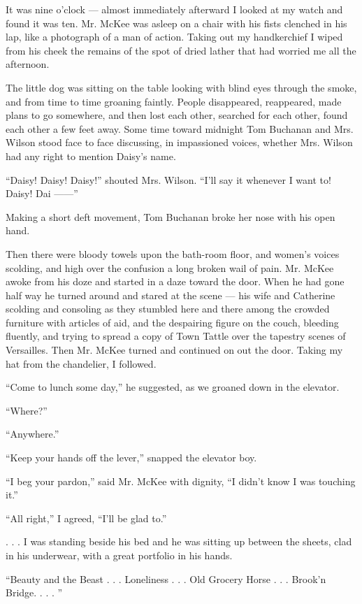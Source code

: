 \documentclass{znotebook}
\begin{document}
It was nine o'clock — almost immediately afterward I looked at my watch and found it was ten. Mr. McKee was asleep on a chair with his fists clenched in his lap, like a photograph of a man of action. Taking out my handkerchief I wiped from his cheek the remains of the spot of dried lather that had worried me all the afternoon.

The little dog was sitting on the table looking with blind eyes through the smoke, and from time to time groaning faintly. People disappeared, reappeared, made plans to go somewhere, and then lost each other, searched for each other, found each other a few feet away. Some time toward midnight Tom Buchanan and Mrs. Wilson stood face to face discussing, in impassioned voices, whether Mrs. Wilson had any right to mention Daisy's name.

``Daisy! Daisy! Daisy!'' shouted Mrs. Wilson. ``I'll say it whenever I want to! Daisy! Dai ——''

Making a short deft movement, Tom Buchanan broke her nose with his open hand.

Then there were bloody towels upon the bath-room floor, and women's voices scolding, and high over the confusion a long broken wail of pain. Mr. McKee awoke from his doze and started in a daze toward the door. When he had gone half way he turned around and stared at the scene — his wife and Catherine scolding and consoling as they stumbled here and there among the crowded furniture with articles of aid, and the despairing figure on the couch, bleeding fluently, and trying to spread a copy of Town Tattle over the tapestry scenes of Versailles. Then Mr. McKee turned and continued on out the door. Taking my hat from the chandelier, I followed.

``Come to lunch some day,'' he suggested, as we groaned down in the elevator.

``Where?''

``Anywhere.''

``Keep your hands off the lever,'' snapped the elevator boy.

``I beg your pardon,'' said Mr. McKee with dignity, ``I didn't know I was touching it.''

``All right,'' I agreed, ``I'll be glad to.''

. . . I was standing beside his bed and he was sitting up between the sheets, clad in his underwear, with a great portfolio in his hands.

``Beauty and the Beast . . . Loneliness . . . Old Grocery Horse . . . Brook'n Bridge. . . . ''
\end{document}
